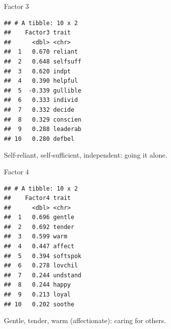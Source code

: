 \documentclass[
  ignorenonframetext,
]{beamer}
\newenvironment{Shaded}{\begin{snugshade}}{\end{snugshade}}
\newcommand{\DecValTok}[1]{\textcolor[rgb]{0.00,0.00,0.81}{#1}}
\newcommand{\KeywordTok}[1]{\textcolor[rgb]{0.13,0.29,0.53}{\textbf{#1}}}
\newcommand{\NormalTok}[1]{#1}
\newcommand{\OperatorTok}[1]{\textcolor[rgb]{0.81,0.36,0.00}{\textbf{#1}}}
\newcommand{\StringTok}[1]{\textcolor[rgb]{0.31,0.60,0.02}{#1}}
\begin{document}
\begin{frame}[fragile]{Factor 3}
\protect\hypertarget{factor-3}{}

\footnotesize

\begin{Shaded}
\end{Shaded}

\begin{verbatim}
## # A tibble: 10 x 2
##    Factor3 trait   
##      <dbl> <chr>   
##  1   0.670 reliant 
##  2   0.648 selfsuff
##  3   0.620 indpt   
##  4   0.390 helpful 
##  5  -0.339 gullible
##  6   0.333 individ 
##  7   0.332 decide  
##  8   0.329 conscien
##  9   0.288 leaderab
## 10   0.280 defbel
\end{verbatim}

\normalsize

Self-reliant, self-sufficient, independent: going it alone.

\end{frame}

\begin{frame}[fragile]{Factor 4}
\protect\hypertarget{factor-4}{}

\footnotesize

\begin{Shaded}
\end{Shaded}

\begin{verbatim}
## # A tibble: 10 x 2
##    Factor4 trait   
##      <dbl> <chr>   
##  1   0.696 gentle  
##  2   0.692 tender  
##  3   0.599 warm    
##  4   0.447 affect  
##  5   0.394 softspok
##  6   0.278 lovchil 
##  7   0.244 undstand
##  8   0.244 happy   
##  9   0.213 loyal   
## 10   0.202 soothe
\end{verbatim}

\normalsize

Gentle, tender, warm (affectionate): caring for others.

\end{frame}
\end{document}

